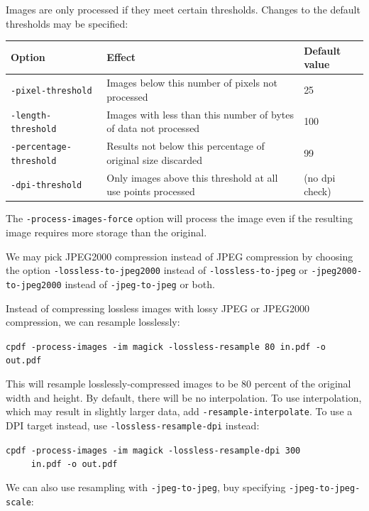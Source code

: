 \documentclass{book}
\begin{document}
\noindent Images are only processed if they meet certain thresholds. Changes to the default thresholds may be specified:

\bigskip
\begin{tabular}{lp{6cm}l}
Option & Effect & Default value\\\hline
{\small\texttt{-pixel-threshold}} & Images below this number of pixels not processed & 25 \\
{\small\texttt{-length-threshold}} & Images with less than this number of bytes of data not processed & 100 \\
{\small\texttt{-percentage-threshold}} & Results not below this percentage of original size discarded & 99 \\
{\small\texttt{-dpi-threshold}} & Only images above this threshold at all use points processed & (no dpi check)
\end{tabular}
\bigskip

\noindent The \texttt{-process-images-force} option will process the image even if the resulting image requires more storage than the original.

We may pick JPEG2000 compression instead of JPEG compression by choosing the option \texttt{-lossless-to-jpeg2000} instead of \texttt{-lossless-to-jpeg} or \texttt{-jpeg2000-to-jpeg2000} instead of \texttt{-jpeg-to-jpeg} or both.

Instead of compressing lossless images with lossy JPEG or JPEG2000 compression, we can resample losslessly:

  \begin{framed}
  \noindent\small\verb!cpdf -process-images -im magick -lossless-resample 80 in.pdf -o out.pdf!
  \end{framed}

\noindent This will resample losslessly-compressed images to be 80 percent of the original width and height. By default, there will be no interpolation. To use interpolation, which may result in slightly larger data, add \texttt{-resample-interpolate}. To use a DPI target instead, use \texttt{-lossless-resample-dpi} instead:

  \begin{framed}
  \noindent\small\verb!cpdf -process-images -im magick -lossless-resample-dpi 300!\\
  \noindent\small\verb!     in.pdf -o out.pdf!
  \end{framed}

\noindent We can also use resampling with \texttt{-jpeg-to-jpeg}, buy specifying \texttt{-jpeg-to-jpeg-scale}:
\end{document}
